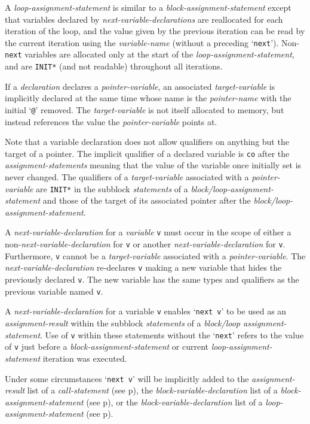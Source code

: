 \documentclass[12pt]{article}
\newcommand{\pagref}[1]{p\pageref{#1}}
\begin{document}
A {\em loop-assignment-statement} is similar to a
{\em block-assignment-statement} except that variables declared
by {\em next-variable-declarations} are reallocated for each iteration
of the loop, and the value given by the previous iteration can be
read by the current iteration using the {\em variable-name}
(without a preceding `{\tt next}').
Non-{\tt next} variables are allocated only at the start of the
{\em loop-assignment-statement}, and are {\tt *INIT*} (and not readable)
throughout all iterations.

If a {\em declaration} declares a {\em pointer-variable},
an associated {\em target-variable} is implicitly declared at the same time
whose name is the {\em pointer-name} with the initial `{\tt @}' removed.
The {\em target-variable} is not itself allocated to memory,
but instead references the value the {\em pointer-variable}
points at.

Note that a variable declaration does not allow
qualifiers on anything but the target of a pointer.  The implicit
qualifier of a declared variable is {\tt co} after the
{\em assignment-statements} meaning that
the value of the variable once initially set is never changed.
The qualifiers of a {\em target-variable} associated with a
{\em pointer-variable} are {\tt *INIT*} in the subblock {\em statements}
of a {\em block/loop-assignment-statement} and those of the target of
its associated pointer after the
{\em block/loop-assignment-statement}.

A {\em next-variable-declaration} for a {\em variable} {\tt v}
must occur in the scope of either a non-{\em next-variable-declaration}
for {\tt v} or another {\em next-variable-declaration} for {\tt v}.
Furthermore, {\tt v} cannot be a {\em target-variable} associated
with a {\em pointer-variable}.
The {\em next-variable-declaration} re-declares {\tt v} making a new
variable that hides the previously declared {\tt v}.  The new variable
has the same types and qualifiers as the previous variable named {\tt v}.

A {\em next-variable-declaration} for a variable {\tt v} enables
`{\tt next v}' to be used as an {\em assignment-result} within the subblock
{\em statements} of a {\em block/loop assignment-statement}.  Use of
{\tt v} within these statements without the `{\tt next}'
refers to the value of {\tt v} just
before a {\em block-assignment-statement} or current
{\em loop-assignment-statement} iteration was executed.

Under some circumstances `{\tt next v}' will
be implicitly added to the {\em assignment-result}
list of a {\em call-statement} (see \pagref{CALL-NEXT-PROMOTION}),
the {\em block-variable-declaration} list
of a {\em block-assignment-statement} (see \pagref{BLOCK-NEXT-PROMOTION}),
or the {\em block-variable-declaration} list of a
{\em loop-assignment-statement} (see \pagref{LOOP-NEXT-PROMOTION}).
\end{document}
